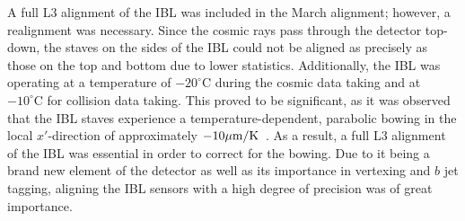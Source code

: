 A full L3 alignment of the IBL was included in the March alignment; however, a realignment was necessary.
Since the cosmic rays pass through the detector top-down, the staves on the sides of the IBL could not be aligned as precisely as those on the top and bottom due to lower statistics.
Additionally, the IBL was operating at a temperature of $-20^{\circ}\textrm{C}$ during the cosmic data taking and at $-10^{\circ}\textrm{C}$ for collision data taking.
This proved to be significant, as it was observed that the IBL staves experience a temperature-dependent, parabolic bowing in the local $x'$-direction of approximately $-10\mu\textrm{m}/\textrm{K}$~\cite{2015.alignment-ibl-stability}.
As a result, a full L3 alignment of the IBL was essential in order to correct for the bowing.
Due to it being a brand new element of the detector as well as its importance in vertexing and $b$ jet tagging, aligning the IBL sensors with a high degree of precision was of great importance.

